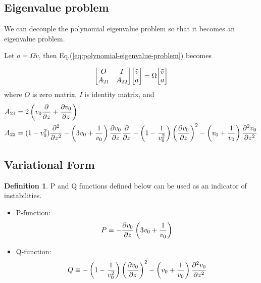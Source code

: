 \documentclass{article}
\theoremstyle{plain}
\theoremstyle{definition}
\newtheorem{definition}{Definition}
\theoremstyle{remark}
\theoremstyle{remark}
\begin{document}
\subsection{Eigenvalue problem}
We can decouple the polynomial eigenvalue problem so that it becomes an eigenvalue problem.

Let $a=\Omega\tilde{v}$, then Eq.(\ref{eq:polynomial-eigenvalue-problem}) becomes

\begin{equation}
    \mqty[ O & I\\A_{21} & A_{22} ]\mqty[ \tilde{v}\\ a] = \Omega\mqty[ \tilde{v}\\ a]
    \label{eq:eigenvalue-problem}
\end{equation}
where $O$ is zero matrix, $I$ is identity matrix, and
\begin{align*}
    A_{21} &= 2\left(v_0\pdv{}{z} +\pdv{v_0}{z} \right) \\
    A_{22} &= (1-v_0^2)\pdv[2]{}{z} 
    -\left(3v_0 + \frac{1}{v_0}\right)\pdv{v_0}{z}\pdv{}{z} 
    - \left(1-\frac{1}{v_0^2}\right)\left(\pdv{v_0}{z}\right)^2 
    - \left(v_0+\frac{1}{v_0}\right)\pdv[2]{v_0}{z}
\end{align*}


\subsection{Variational Form}
\begin{definition}
    P and Q functions defined below can be used as an indicator of instabilities.
    \begin{itemize}
        \item P-function: 
        \begin{equation}
            P \equiv -\pdv{v_0}{z}\left(3v_0 + \frac{1}{v_0}\right)
            \label{eq:P-function}
        \end{equation}
        \item Q-function:
        \begin{equation}
            Q \equiv - \left(1-\frac{1}{v_0^2}\right)\left(\pdv{v_0}{z}\right)^2 
            - \left(v_0+\frac{1}{v_0}\right)\pdv[2]{v_0}{z}
            \label{eq:Q-function}
        \end{equation}
    \end{itemize}
\end{definition}
\end{document}
